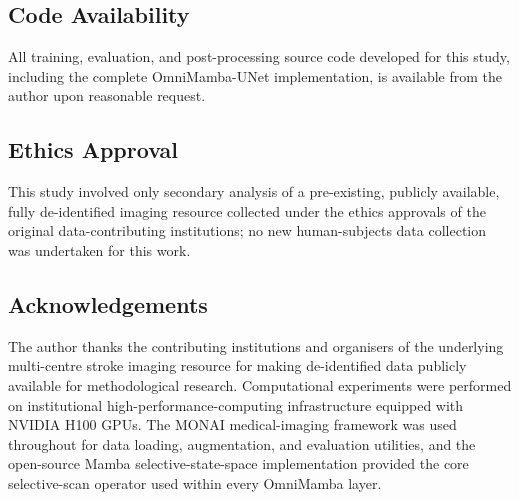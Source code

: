 \documentclass[pdflatex,sn-mathphys-num]{sn-jnl}
\begin{document}
\subsection*{Code Availability}
All training, evaluation, and post-processing source code developed
for this study, including the complete OmniMamba-UNet
implementation, is available from the author upon reasonable
request.

\subsection*{Ethics Approval}
This study involved only secondary analysis of a pre-existing,
publicly available, fully de-identified imaging resource collected
under the ethics approvals of the original data-contributing
institutions; no new human-subjects data collection was undertaken for
this work.

\subsection*{Acknowledgements}
The author thanks the contributing institutions and organisers of the
underlying multi-centre stroke imaging resource for making
de-identified data publicly available for methodological research.
Computational experiments were performed on institutional
high-performance-computing infrastructure equipped with NVIDIA H100
GPUs. The MONAI medical-imaging framework \citep{cardoso2022monai}
was used throughout for data loading, augmentation, and evaluation
utilities, and the open-source Mamba selective-state-space
implementation \citep{gu2023mamba} provided the core selective-scan
operator used within every OmniMamba layer.
\end{document}
